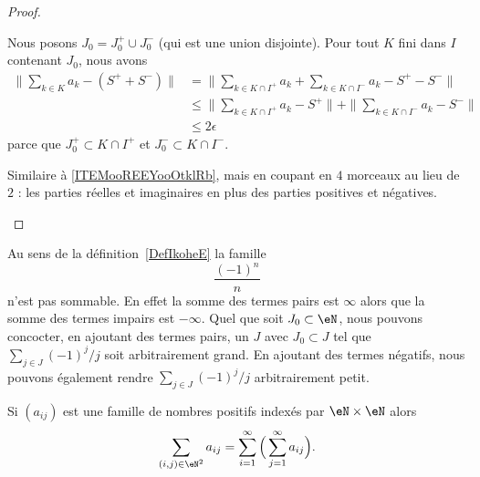 \begin{proof}
\begin{subproof}
    Nous posons \( J_0=J_0^+\cup J_0^-\) (qui est une union disjointe). Pour tout \( K\) fini dans \( I\) contenant \( J_0\), nous avons
        \begin{subequations}
            \begin{align}
                \| \sum_{k\in K}a_k-(S^++S^-) \|&=\| \sum_{k\in K\cap I^+}a_k+\sum_{k\in K\cap I^-}a_k-S^+-S^- \|\\
                &\leq\| \sum_{k\in K\cap I^+}a_k-S^+ \|+\| \sum_{k\in K\cap I^-}a_k-S^- \|\\
                &\leq 2\epsilon
            \end{align}
        \end{subequations}
        parce que \( J_0^+\subset K\cap I^+\) et \( J_0^-\subset K\cap I^-\).

        Similaire à \ref{ITEMooREEYooOtklRb}, mais en coupant en $4$ morceaux au lieu de \( 2\) : les parties réelles et imaginaires en plus des parties positives et négatives.
    \end{subproof}
\end{proof}

\begin{example}     \label{EXooULLXooTDFYqf}
	Au sens de la définition~\ref{DefIkoheE} la famille
	\begin{equation}
		\frac{ (-1)^n }{ n }
	\end{equation}
	n'est pas sommable. En effet la somme des termes pairs est \( \infty\) alors que la somme des termes impairs est \( -\infty\). Quel que soit \( J_0\subset \eN\), nous pouvons concocter, en ajoutant des termes pairs, un \( J\) avec \( J_0\subset J\) tel que \( \sum_{j\in J}(-1)^j/j\) soit arbitrairement grand. En ajoutant des termes négatifs, nous pouvons également rendre \( \sum_{j\in J}(-1)^j/j\) arbitrairement petit.
\end{example}

\begin{proposition} \label{PropVQCooYiWTs}
	Si \( (a_{ij})\) est une famille de nombres positifs indexés par \( \eN\times \eN\) alors
	\begin{equation}
        \sum_{(i,j)\in \eN^2}a_{ij}=\sum_{i=1}^{\infty}\Big( \sum_{j=1}^{\infty}a_{ij} \Big).
	\end{equation}
\end{proposition}

